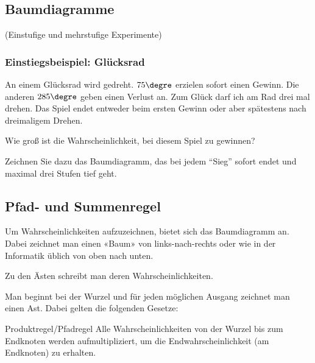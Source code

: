 \newpage


\subsection{Baumdiagramme}
(Einstufige und mehrstufige Experimente)


\subsubsection{Einstiegsbeispiel: Glücksrad}
An einem Glücksrad wird gedreht. $75\degre$ erzielen sofort einen Gewinn. Die anderen $285\degre$ geben einen Verlust an. Zum Glück darf ich am Rad drei mal drehen. Das Spiel endet entweder beim ersten Gewinn oder aber spätestens nach dreimaligem Drehen.

Wie groß ist die Wahrscheinlichkeit, bei diesem Spiel zu gewinnen?

Zeichnen Sie dazu das Baumdiagramm, das bei jedem ``Sieg'' sofort endet und
maximal drei Stufen tief geht.



\newpage

\subsection{Pfad- und Summenregel}
Um Wahrscheinlichkeiten aufzuzeichnen, bietet sich das Baumdiagramm an.
Dabei zeichnet man einen «Baum» von links-nach-rechts oder wie in der Informatik üblich von oben nach unten.

Zu den Ästen schreibt man deren Wahrscheinlichkeiten.

Man beginnt bei der Wurzel und für jeden möglichen Ausgang zeichnet man einen Ast. Dabei gelten die folgenden Gesetze:



\begin{gesetz}{Produktregel/Pfadregel}{}
Alle Wahrscheinlichkeiten von der Wurzel bis zum Endknoten werden aufmultipliziert, um die Endwahrscheinlichkeit (am Endknoten) zu erhalten.
\end{gesetz}


